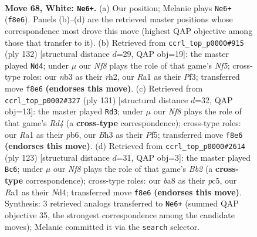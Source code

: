 \documentclass[11pt]{article}
\begin{document}
\clearpage

\begin{figure}[p]\centering
\begin{subfigure}{0.46\textwidth}\centering
\resizebox{\linewidth}{!}{%
\newchessgame
\chessboard[
  setfen={b4N2/P5k1/8/8/1p3P2/1n4PB/4K2P/R7 w - - 4 68},
  showmover=false,
  pgfstyle=straightmove, color=movearrow, markmove={f8-e6}
]}
\caption{}
\end{subfigure}\hfill
\begin{subfigure}{0.46\textwidth}\centering
\resizebox{\linewidth}{!}{%
\newchessgame
\chessboard[
  setfen={4n3/3R4/6k1/5N2/8/1P1K1PP1/2P4r/8 w - - 3 67},
  showmover=false,
  pgfstyle=straightmove, color=movearrow, markmove={f5-d4}
]}
\caption{}
\end{subfigure}
\\[4pt]
\begin{subfigure}{0.46\textwidth}\centering
\resizebox{\linewidth}{!}{%
\newchessgame
\chessboard[
  setfen={6k1/6p1/1P2K2p/3r1p1P/8/8/1B4P1/8 b - - 0 66},
  showmover=false,
  pgfstyle=straightmove, color=movearrow, markmove={d5-d3}
]}
\caption{}
\end{subfigure}\hfill
\begin{subfigure}{0.46\textwidth}\centering
\resizebox{\linewidth}{!}{%
\newchessgame
\chessboard[
  setfen={5k2/1b4p1/5p2/2P1p3/3n4/2N5/5K1P/1R6 b - - 4 62},
  showmover=false,
  pgfstyle=straightmove, color=movearrow, markmove={b7-c6}
]}
\caption{}
\end{subfigure}
\caption{\textbf{Move 68, White: \texttt{Ne6+}.} (a) Our position; Melanie plays \texttt{Ne6+} (\texttt{f8e6}). Panels (b)--(d) are the retrieved master positions whose correspondence most drove this move (highest QAP objective among those that transfer to it). (b) Retrieved from \texttt{ccrl\_top\_p0000\#915} (ply 132) [structural distance $d$=29, QAP obj=19]: the master played \texttt{Nd4}; under $\mu$ our \emph{Nf8} plays the role of that game's \emph{Nf5}; cross-type roles: our \emph{n}b3 as their \emph{r}h2, our \emph{R}a1 as their \emph{P}f3; transferred move \texttt{f8e6} \textbf{(endorses this move)}. (c) Retrieved from \texttt{ccrl\_top\_p0002\#327} (ply 131) [structural distance $d$=32, QAP obj=13]: the master played \texttt{Rd3}; under $\mu$ our \emph{Nf8} plays the role of that game's \emph{Rd4} (a \textbf{cross-type} correspondence); cross-type roles: our \emph{R}a1 as their \emph{p}b6, our \emph{B}h3 as their \emph{P}f5; transferred move \texttt{f8e6} \textbf{(endorses this move)}. (d) Retrieved from \texttt{ccrl\_top\_p0000\#2614} (ply 123) [structural distance $d$=31, QAP obj=3]: the master played \texttt{Bc6}; under $\mu$ our \emph{Nf8} plays the role of that game's \emph{Bb2} (a \textbf{cross-type} correspondence); cross-type roles: our \emph{b}a8 as their \emph{p}c5, our \emph{R}a1 as their \emph{N}d4; transferred move \texttt{f8e6} \textbf{(endorses this move)}. Synthesis: 3 retrieved analogs transferred to \texttt{Ne6+} (summed QAP objective 35, the strongest correspondence among the candidate moves); Melanie committed it via the \texttt{search} selector.}
\label{fig:thought-m134}
\end{figure}
\end{document}

